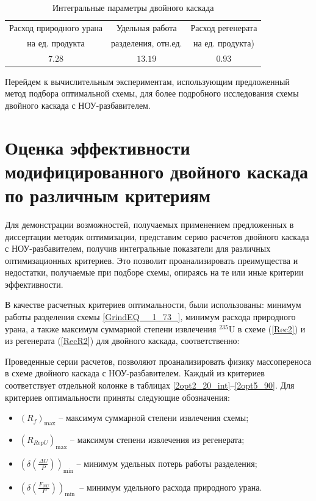 \begin{table}
\begin{tabular}{|c|c|c|}
    \hline Расход природного урана & Удельная работа & Расход регенерата \\
    на ед. продукта & разделения, отн.ед. & на ед. продукта) \\
    \hline $7.28$ & $13.19$ & $0.93$ \\
    \hline
\end{tabular}
\caption{Интегральные параметры двойного каскада}\label{MDKparams}
\end{table}


Перейдем к вычислительным экспериментам, использующим предложенный метод подбора оптимальной схемы, для более подробного исследования схемы двойного каскада с НОУ-разбавителем.

\section{Оценка эффективности модифицированного двойного каскада по различным критериям}

Для демонстрации возможностей, получаемых применением предложенных в диссертации методик оптимизации, представим серию расчетов двойного каскада с НОУ-разбавителем, получив интегральные показатели для различных оптимизационных критериев. Это позволит проанализировать преимущества и недостатки, получаемые при подборе схемы, опираясь на те или иные критерии эффективности.

В качестве расчетных критериев оптимальности, были использованы: минимум работы разделения схемы \ref{GrindEQ__1_73_}, минимум расхода природного урана, а также максимум суммарной степени извлечения $^{235}$U в схеме (\ref{Rec2}) и из регенерата (\ref{RecR2}) для двойного каскада, соответственно:

Проведенные серии расчетов, позволяют проанализировать физику массопереноса в схеме двойного каскада с НОУ-разбавителем. Каждый из критериев соответствует отдельной колонке в таблицах \ref{2opt2_20_int}--\ref{2opt5_90}. Для критериев оптимальности приняты следующие обозначения:

\begin{itemize}
    \item $(R_f)_\text{max}$ -- максимум суммарной степени извлечения схемы;
    \item $(R_{RepU})_\text{max}$ -- максимум степени извлечения из регенерата;
    \item $(\delta(\frac{\Delta U}{P}))_\text{min}$ -- минимум удельных потерь работы разделения; 
    \item $(\delta(\frac{F_{NU}}{P}))_\text{min}$\ -- минимум удельного расхода природного урана.
\end{itemize}

